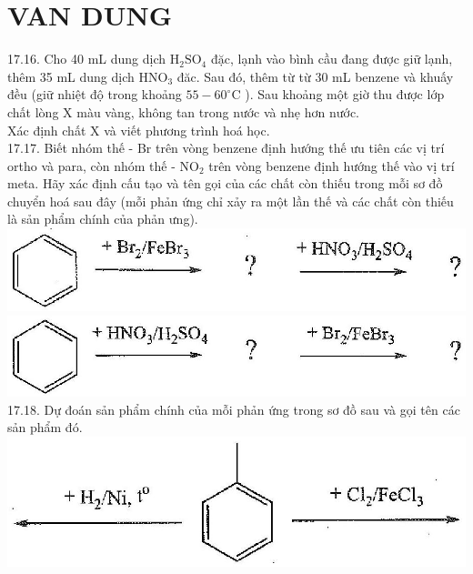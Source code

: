 \documentclass[10pt]{article}
\begin{document}
\section*{VAN DUNG}
17.16. Cho 40 mL dung dịch $\mathrm{H}_{2} \mathrm{SO}_{4}$ đặc, lạnh vào bình cầu đang được giữ lạnh, thêm 35 mL dung dịch $\mathrm{HNO}_{3}$ đăc. Sau đó, thêm từ từ 30 mL benzene và khuấy đều (giữ nhiệt độ trong khoảng $55-60^{\circ} \mathrm{C}$ ). Sau khoảng một giờ thu được lớp chất lòng X màu vàng, không tan trong nước và nhẹ hơn nước.\\
Xác định chất X và viết phương trình hoá học.\\
17.17. Biết nhóm thế - Br trên vòng benzene định hướng thế ưu tiên các vị trí ortho và para, còn nhóm thế - $\mathrm{NO}_{2}$ trên vòng benzene định hướng thế vào vị trí meta. Hãy xác định cấu tạo và tên gọi của các chất còn thiếu trong mỗi sơ đồ chuyển hoá sau đây (mỗi phản ứng chỉ xảy ra một lần thế và các chất còn thiếu là sản phẩm chính của phản ưng).\\
\includegraphics[max width=\textwidth, center]{2025_10_23_fa9073eecee116ad8cf2g-59(2)}\\
\includegraphics[max width=\textwidth, center]{2025_10_23_fa9073eecee116ad8cf2g-59}\\
17.18. Dự đoán sản phẩm chính của mỗi phản ứng trong sơ đồ sau và gọi tên các sản phẩm đó.\\
\includegraphics[max width=\textwidth, center]{2025_10_23_fa9073eecee116ad8cf2g-59(4)}\\
\end{document}
